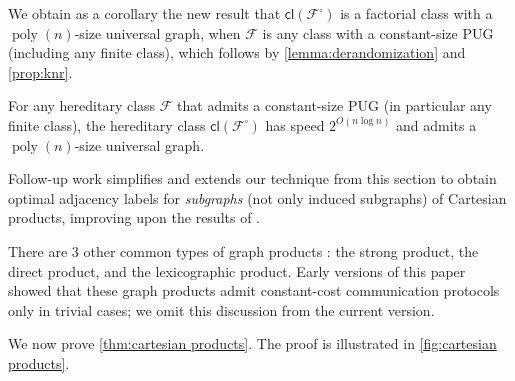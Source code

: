 \documentclass{article}
\makeatletter
\DeclareMathOperator{\poly}{poly}
\newcommand{\cF}{\ensuremath{\mathcal{F}}}
\newcommand{\cl}{\mathsf{cl}}
\newcommand\IfRestateTF{%
  \ifx\label\thmt@gobble@label %
    \expandafter\@firstoftwo
  \else
    \expandafter\@secondoftwo
  \fi
}
\newcommand{\RestateRemark}{\IfRestateTF{{\normalfont\bfseries (Restated) }}{}}
\makeatother
\begin{document}

We obtain as a corollary the new result that $\cl(\cF^\square)$ is a factorial class with a
$\poly(n)$-size universal graph, when $\cF$ is any class with a constant-size PUG (including any
finite class), which follows by \cref{lemma:derandomization} and \cref{prop:knr}.
\begin{corollary}
For any hereditary class $\cF$ that admits a constant-size PUG (in particular any finite class), the
hereditary class $\cl(\cF^\square)$ has speed $2^{O(n \log n)}$ and admits a $\poly(n)$-size universal
graph.
\end{corollary}

Follow-up work \cite{EHZ23} simplifies and extends our technique from this section to obtain optimal
adjacency labels for \emph{subgraphs} (not only induced subgraphs) of Cartesian products, improving
upon the results of \cite{CLR20}.

\begin{remark}
There are 3 other common types of graph products \cite{HIK11}: the strong product, the direct
product, and the lexicographic product. Early versions of this paper showed that these graph
products admit constant-cost communication protocols only in trivial cases; we omit this discussion
from the current version.
\end{remark}

We now prove \cref{thm:cartesian products}.  The proof is illustrated in \cref{fig:cartesian
products}. 
\end{document}
